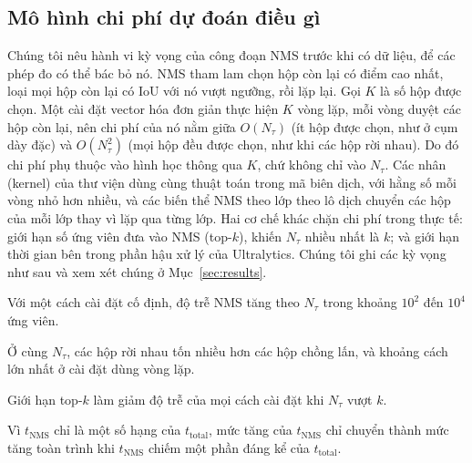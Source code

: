 \documentclass[a4paper,fleqn]{cas-dc}
\newcommand{\Ntau}{N_{\tau}}
\begin{document}
\subsection{Mô hình chi phí dự đoán điều gì}
Chúng tôi nêu hành vi kỳ vọng của công đoạn NMS trước khi có dữ liệu, để các phép đo có thể bác bỏ nó. NMS tham lam chọn hộp còn lại có điểm cao nhất, loại mọi hộp còn lại có IoU với nó vượt ngưỡng, rồi lặp lại. Gọi $K$ là số hộp được chọn. Một cài đặt vector hóa đơn giản thực hiện $K$ vòng lặp, mỗi vòng duyệt các hộp còn lại, nên chi phí của nó nằm giữa $O(\Ntau)$ (ít hộp được chọn, như ở cụm dày đặc) và $O(\Ntau^2)$ (mọi hộp đều được chọn, như khi các hộp rời nhau). Do đó chi phí phụ thuộc vào hình học thông qua $K$, chứ không chỉ vào $\Ntau$. Các nhân (kernel) của thư viện dùng cùng thuật toán trong mã biên dịch, với hằng số mỗi vòng nhỏ hơn nhiều, và các biến thể NMS theo lớp theo lô dịch chuyển các hộp của mỗi lớp thay vì lặp qua từng lớp. Hai cơ chế khác chặn chi phí trong thực tế: giới hạn số ứng viên đưa vào NMS (top-$k$), khiến $\Ntau$ nhiều nhất là $k$; và giới hạn thời gian bên trong phần hậu xử lý của Ultralytics. Chúng tôi ghi các kỳ vọng như sau và xem xét chúng ở Mục~\ref{sec:results}.
\begin{description}[leftmargin=2.5em,labelwidth=2.2em,itemsep=2pt]
\item[H1] Với một cách cài đặt cố định, độ trễ NMS tăng theo $\Ntau$ trong khoảng $10^2$ đến $10^4$ ứng viên.
\item[H2] Ở cùng $\Ntau$, các hộp rời nhau tốn nhiều hơn các hộp chồng lấn, và khoảng cách lớn nhất ở cài đặt dùng vòng lặp.
\item[H3] Giới hạn top-$k$ làm giảm độ trễ của mọi cách cài đặt khi $\Ntau$ vượt $k$.
\item[H4] Vì $t_{\mathrm{NMS}}$ chỉ là một số hạng của $t_{\mathrm{total}}$, mức tăng của $t_{\mathrm{NMS}}$ chỉ chuyển thành mức tăng toàn trình khi $t_{\mathrm{NMS}}$ chiếm một phần đáng kể của $t_{\mathrm{total}}$.
\end{description}
\end{document}
